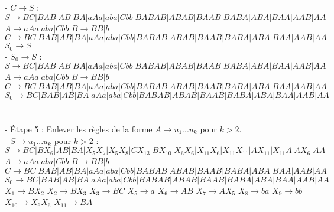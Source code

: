 \documentclass{article}
\begin{document}
- $C \rightarrow S$ :
\newline $S \rightarrow BC|BAB|AB|BA|aAa|aba|Cbb|BABAB|ABAB|BAAB|BABA|ABA|BAA|AAB|AA$
\newline $A \rightarrow aAa|aba|Cbb$
\newline $B \rightarrow BB|b$
\newline $C \rightarrow BC|BAB|AB|BA|aAa|aba|Cbb|BABAB|ABAB|BAAB|BABA|ABA|BAA|AAB|AA$
\newline $S_0 \rightarrow S$
\\

- $S_0 \rightarrow S$ :
\newline $S \rightarrow BC|BAB|AB|BA|aAa|aba|Cbb|BABAB|ABAB|BAAB|BABA|ABA|BAA|AAB|AA$
\newline $A \rightarrow aAa|aba|Cbb$
\newline $B \rightarrow BB|b$
\newline $C \rightarrow BC|BAB|AB|BA|aAa|aba|Cbb|BABAB|ABAB|BAAB|BABA|ABA|BAA|AAB|AA$
\newline $S_0 \rightarrow BC|BAB|AB|BA|aAa|aba|Cbb|BABAB|ABAB|BAAB|BABA|ABA|BAA|AAB|AA$
\\
\\
\\
- Étape 5 : Enlever les règles de la forme $A \rightarrow u_1...u_k$ pour $k>2$.\\

- $S \rightarrow u_1...u_k$ pour $k>2$ :
\newline $S \rightarrow BC|BX_6|AB|BA|X_5X_7|X_5X_8|CX_{13}|BX_{10}|X_6X_6|X_{11}X_6|X_{11}X_{11}|AX_{11}|X_{11}A|AX_6|AA$
\newline $A \rightarrow aAa|aba|Cbb$
\newline $B \rightarrow BB|b$
\newline $C \rightarrow BC|BAB|AB|BA|aAa|aba|Cbb|BABAB|ABAB|BAAB|BABA|ABA|BAA|AAB|AA$
\newline $S_0 \rightarrow BC|BAB|AB|BA|aAa|aba|Cbb|BABAB|ABAB|BAAB|BABA|ABA|BAA|AAB|AA$
\newline $X_1 \rightarrow BX_2$
\newline $X_2 \rightarrow BX_3$
\newline $X_3 \rightarrow BC$
\newline $X_5 \rightarrow a$
\newline $X_6 \rightarrow AB$
\newline $X_7 \rightarrow AX_5$
\newline $X_8 \rightarrow ba$
\newline $X_9 \rightarrow bb$
\newline $X_{10} \rightarrow X_6X_6$
\newline $X_{11} \rightarrow BA$
\\
\\
\end{document}
